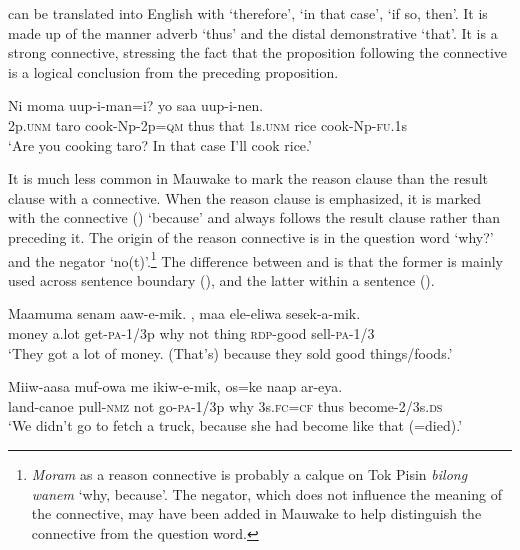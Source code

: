  can be translated into English with `therefore', `in that case', `if so, then'. It is made up of the manner adverb  `thus' and the distal demonstrative  `that'. It is a strong connective, stressing the fact that the proposition following the connective is a logical conclusion from the preceding proposition.

\ea%
\label{ex:x737}
\gll Ni moma uup-i-man=i?   yo saa uup-i-nen.\\
2p.\textsc{unm} taro cook-Np-2p=\textsc{qm} thus that 1s.\textsc{unm} rice cook-Np-\textsc{fu}.1s\\
\glt`Are you cooking taro? In that case I'll cook rice.'
\z

It is much less common in Mauwake to mark the reason clause than the result clause with a connective. When the reason clause is emphasized, it is marked with the connective  () `because' and always follows the result clause rather than preceding it. The origin of the reason connective is in the question word  `why?' and the negator  `no(t)'.\footnote{\textit{Moram} as a reason connective is probably a calque on Tok Pisin \textit{bilong wanem} `why, because'. The negator, which does not influence the meaning of the connective, may have been added in Mauwake to help distinguish the connective from the question word.} The difference between  and  is that the former is mainly used across sentence boundary (), and the latter within a sentence ().

\ea%
\label{ex:x738}
\gll Maamuma senam aaw-e-mik.  , maa ele-eliwa sesek-a-mik. \\
money a.lot get-\textsc{pa}-1/3p why not thing \textsc{rdp}-good sell-\textsc{pa}-1/3\\
\glt`They got a lot of money. (That's) because they sold good things/foods.'
\z

\ea%
\label{ex:x739}
\gll Miiw-aasa muf-owa me ikiw-e-mik,  os=ke naap ar-eya.\\
land-canoe pull-\textsc{nmz} not go-\textsc{pa}-1/3p why 3s.\textsc{fc}=\textsc{cf} thus become-2/3s.\textsc{ds}\\
\glt`We didn't go to fetch a truck, because she had become like that (=died).'
\z


